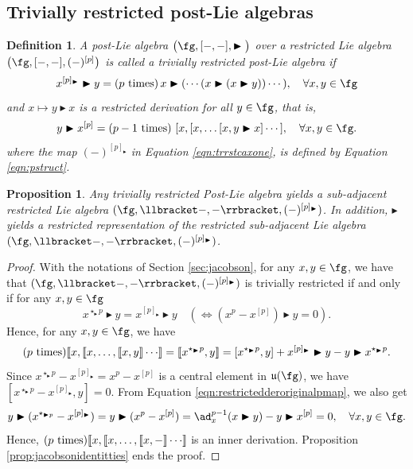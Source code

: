 \documentclass[12pt]{article}
\newcommand{\red}{\color{red}}
\newcommand{\black}{\color{black}}
\newcommand{\btr}{\blacktriangleright}
\newtheorem{proposition}[theorem]{Proposition}
\newtheorem{definition}[theorem]{Definition}
\begin{document}
\subsection{Trivially restricted post-Lie algebras} 
\begin{definition}\label{def:triviallyrestricted} A post-Lie algebra $\bigl(\fg, [-,-], \btr\bigl)$ over a restricted Lie algebra $\bigl(\fg, [-,-], (-)^{[p]}\bigl)$ is called a \emph{trivially restricted post-Lie algebra} if
\begin{equation}
\label{eqn:trrstcaxone}
x^{[p]_{\btr}} \btr y= (p \text{ times})\, x \btr ( \cdots (x \btr (x \btr y))\cdots ), \quad \forall x,y \in \fg
\end{equation}
and $x\mapsto y \btr x$ is a restricted derivation for all $y\in \fg$, that is,
\begin{align}
\label{eqn:restrictedderoriginalpmap}
y \btr x^{[p]} = (p-1~{\rm times} )\,\,[x, [x, \ldots[x, y \btr x]\cdots],\quad \forall x,y \in \fg.
\end{align}
where the map $(-)^{[p]_{\btr}} $ in Equation \eqref{eqn:trrstcaxone}, is defined by Equation \eqref{eqn:pstruct}.
\end{definition}
\begin{proposition}
\label{prop:fromtriviallyrestrictedtolierestricted}
Any trivially restricted Post-Lie algebra yields a sub-adjacent restricted Lie algebra $(\fg, \llbracket-,-\rrbracket, (-)^{[p]_{\btr}})$. In addition, $\btr$ yields a restricted representation of the restricted sub-adjacent Lie algebra $(\fg,\llbracket-,-\rrbracket, (-)^{[p]_{\btr}})$.
\end{proposition}
\begin{proof}
With the notations of Section \ref{sec:jacobson}, for any $x,y \in \fg$, we have that $(\fg,\llbracket-,-\rrbracket, (-)^{[p]_{\btr}})$ is trivially restricted if and only if for any $x,y \in \fg$
$$
x^{\star_{\btr}p} \btr y = x^{[p]_{\btr}} \btr y \quad (\Leftrightarrow (x^{p}-x^{[p]}) \btr y =0).
$$
Hence, for any $x,y \in \fg$, we have
$$
(p~{\rm times} )\llbracket x, \llbracket x, \ldots,\llbracket x,y \rrbracket \cdots \rrbracket = \llbracket x^{\star_{\btr} p},y \rrbracket = [x^{\star_{\btr} p},y] + x^{[p]_{\btr}}\btr y - y \btr x^{\star_{\btr} p}.
$$
Since $x^{\star_{\btr}p} - x^{[p]_{\btr}} = x^{p} - x^{[p]}$ is a central element in $\mathfrak{u}(\fg)$, we have $[x^{\star_{\btr}p} - x^{[p]_{\btr}},y] = 0$.
From Equation \eqref{eqn:restrictedderoriginalpmap}, we also get 
$$
y \btr (x^{\star_{\btr p}} - x^{[p]_{\btr}})= y \btr (x^{p}-x^{[p]}) = \ad_{x}^{p-1}(x\btr y) - y \btr x^{[p]} = 0,\quad \forall x,y\in \fg.
$$
Hence, 
$(p~{\rm times} )\llbracket x, \llbracket x, \ldots,\llbracket x, - \rrbracket \cdots \rrbracket$
is an inner derivation. Proposition \ref{prop:jacobsonidentitties} ends the proof.
\end{proof}
\end{document}
